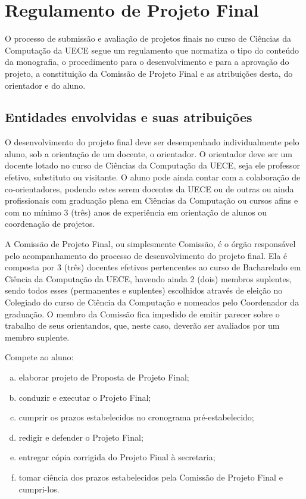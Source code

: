\chapter{Regulamento de Projeto Final}
\label{cha:regulamento}

O processo de submissão e avaliação de projetos finais no curso
de Ciências da Computa\-ção da UECE segue um regulamento que normatiza 
o tipo do conteúdo da monografia, o procedimento para o desenvolvimento 
e para a aprovação do projeto, a constituição da Comissão de Projeto 
Final e as atribuições desta, do orientador e do aluno. 

\section{Entidades envolvidas e suas atribuições}
O desenvolvimento do projeto final deve ser desempenhado individualmente
pelo aluno, sob a orientação de um docente, o orientador. O orientador deve
ser um docente lotado no curso de Ciências da Computação da UECE, seja ele
professor efetivo, substituto ou visitante. O aluno pode ainda contar com a
colaboração de co-orientadores, podendo estes serem docentes da UECE ou de 
outras  ou ainda profissionais com graduação
plena em Ciências da Computação ou cursos afins e com no mínimo 3 (três) anos
de experiência em orientação de alunos ou coordenação de projetos.

A Comissão de Projeto Final, ou simplesmente Comissão, é o órgão 
responsável pelo acompanhamento do processo de desenvolvimento do projeto final. 
Ela é composta por 3 (três) docentes efetivos pertencentes ao curso de 
Bacharelado em Ciência da Computação da UECE, havendo ainda 2 (dois) membros 
suplentes, sendo todos esses (permanentes e suplentes) escolhidos através de 
eleição no Colegiado do curso de Ciência da Computação e nomeados pelo 
Coordenador da graduação. O membro da Comissão fica impedido de emitir 
parecer sobre o trabalho de seus orientandos, que, neste caso, 
deverão ser avaliados por um membro suplente.

Compete ao aluno:
\begin{enumerate}[a.]
\item elaborar projeto de Proposta de Projeto Final;
\item conduzir e executar o Projeto Final;
\item cumprir os prazos estabelecidos no cronograma pré-estabelecido;
\item redigir e defender o Projeto Final;
\item entregar cópia corrigida do Projeto Final à secretaria;
\item tomar ciência dos prazos estabelecidos pela Comissão de Projeto Final e cumpri-los.
\end{enumerate}

